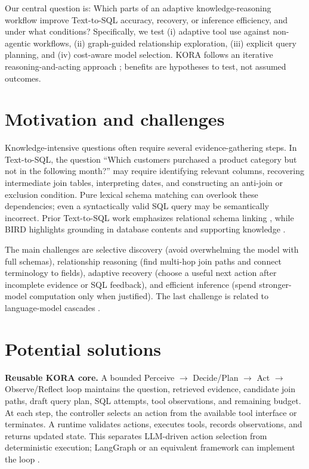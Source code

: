 \documentclass{article}
\begin{document}
Our central question is: Which parts of an adaptive knowledge-reasoning workflow improve Text-to-SQL accuracy, recovery, or inference efficiency, and under what conditions? Specifically, we test (i) adaptive tool use against non-agentic workflows, (ii) graph-guided relationship exploration, (iii) explicit query planning, and (iv) cost-aware model selection. KORA follows an iterative reasoning-and-acting approach \citep{yao2023react}; benefits are hypotheses to test, not assumed outcomes.

\section{Motivation and challenges}
Knowledge-intensive questions often require several evidence-gathering steps. In Text-to-SQL, the question ``Which customers purchased a product category but not in the following month?'' may require identifying relevant columns, recovering intermediate join tables, interpreting dates, and constructing an anti-join or exclusion condition. Pure lexical schema matching can overlook these dependencies; even a syntactically valid SQL query may be semantically incorrect. Prior Text-to-SQL work emphasizes relational schema linking \citep{wang2020ratsql}, while BIRD highlights grounding in database contents and supporting knowledge \citep{li2023bird}.

The main challenges are selective discovery (avoid overwhelming the model with full schemas), relationship reasoning (find multi-hop join paths and connect terminology to fields), adaptive recovery (choose a useful next action after incomplete evidence or SQL feedback), and efficient inference (spend stronger-model computation only when justified). The last challenge is related to language-model cascades \citep{chen2023frugalgpt}.

\section{Potential solutions}
\textbf{Reusable KORA core.} A bounded Perceive $\rightarrow$ Decide/Plan $\rightarrow$ Act $\rightarrow$ Observe/Reflect loop maintains the question, retrieved evidence, candidate join paths, draft query plan, SQL attempts, tool observations, and remaining budget. At each step, the controller selects an action from the available tool interface or terminates. A runtime validates actions, executes tools, records observations, and returns updated state. This separates LLM-driven action selection from deterministic execution; LangGraph or an equivalent framework can implement the loop \citep{langchain2026langgraph}.
\end{document}
